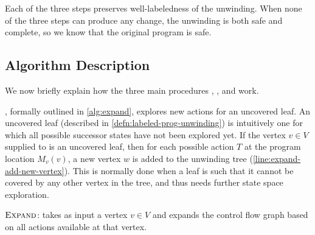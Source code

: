 Each of the three steps preserves well-labeledness of the unwinding. When none of the
three steps can produce any change, the unwinding is both safe and complete, so we know
that the original program is safe.

\subsection{Algorithm Description}
We now briefly explain how the three main procedures \expand, , and \cover work.

\expand, formally outlined in \autoref{alg:expand}, explores new actions for an uncovered
leaf. An uncovered leaf (described in \autoref{defn:labeled-prog-unwinding}) is
intuitively one for which all possible successor states have not been explored yet. If the
vertex $v \in V$ supplied to \expand is an uncovered leaf, then for each possible action
$T$ at the program location $M_v(v)$, a new vertex $w$ is added to the unwinding tree
(\autoref{line:expand-add-new-vertex}). This is normally done when a leaf is such that it
cannot be covered by any other vertex in the tree, and thus needs further state space
exploration.

\begin{algorithm}[ht]


  \caption{$\textsc{Expand}$: takes as input a vertex $v \in V$ and expands the control flow graph based on all actions available at that vertex.}
  \label{alg:expand}
\end{algorithm}

